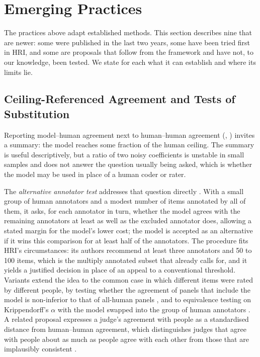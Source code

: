 \section{Emerging Practices}
\label{sec:emerging}

The practices above adapt established methods. This section describes nine
that are newer: some were published in the last two years, some have been
tried first in HRI, and some are proposals that follow from the framework and
have not, to our knowledge, been tested. We state for each what it can
establish and where its limits lie.

\subsection{Ceiling-Referenced Agreement and Tests of Substitution}
\label{sec:equivalence}

Reporting model--human agreement next to human--human agreement
(, ) invites a summary: the model reaches some
fraction of the human ceiling. The summary is useful descriptively, but a
ratio of two noisy coefficients is unstable in small samples and does not
answer the question usually being asked, which is whether the model may be
used in place of a human coder or rater.

The \emph{alternative annotator test} addresses that question directly
\cite{calderon2025alternative}. With a small group of human annotators and a
modest number of items annotated by all of them, it asks, for each annotator
in turn, whether the model agrees with the remaining annotators at least as
well as the excluded annotator does, allowing a stated margin for the
model's lower cost; the model is accepted as an alternative if it wins this
comparison for at least half of the annotators. The procedure fits HRI's
circumstances: its authors recommend at least three annotators and 50 to 100
items, which is the multiply annotated subset that  already
calls for, and it yields a justified decision in place of an appeal to a
conventional threshold. Variants extend the idea to the common case in which
different items were rated by different people, by testing whether the
agreement of panels that include the model is non-inferior to that of
all-human panels \cite{omar2026altratest}, and to equivalence testing on
Krippendorff's $\alpha$ with the model swapped into the group of human
annotators \cite{he2025can}. A related proposal expresses a judge's
agreement with people as a standardised distance from human--human
agreement, which distinguishes judges that agree with people about as much
as people agree with each other from those that are implausibly consistent
\cite{han2025judges}.


